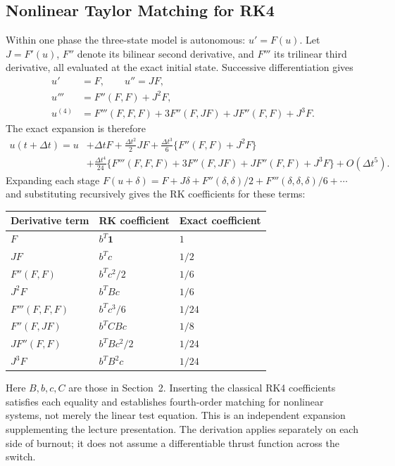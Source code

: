 \documentclass{article}
\begin{document}
\subsection{Nonlinear Taylor Matching for RK4}
Within one phase the three-state model is autonomous: $u'=F(u)$. Let $J=F'(u)$, $F''$ denote its bilinear second derivative, and $F'''$ its trilinear third derivative, all evaluated at the exact initial state. Successive differentiation gives
\begin{align*}
 u'&=F,\qquad u''=JF,\\
 u'''&=F''(F,F)+J^2F,\\
 u^{(4)}&=F'''(F,F,F)+3F''(F,JF)+JF''(F,F)+J^3F.
\end{align*}
The exact expansion is therefore
\begin{align*}
 u(t+\Delta t)=u
 &+\Delta t F+\frac{\Delta t^2}{2}JF
 +\frac{\Delta t^3}{6}\{F''(F,F)+J^2F\}\\
 &+\frac{\Delta t^4}{24}\{F'''(F,F,F)+3F''(F,JF)+JF''(F,F)+J^3F\}
 +O(\Delta t^5).
\end{align*}
Expanding each stage $F(u+\delta)=F+J\delta+F''(\delta,\delta)/2+F'''(\delta,\delta,\delta)/6+\cdots$ and substituting recursively gives the RK coefficients for these terms:
\begin{center}
\begin{tabular}{lll}
\toprule
Derivative term & RK coefficient & Exact coefficient\\
\midrule
$F$ & $b^T\mathbf{1}$ & $1$\\
$JF$ & $b^Tc$ & $1/2$\\
$F''(F,F)$ & $b^Tc^2/2$ & $1/6$\\
$J^2F$ & $b^TBc$ & $1/6$\\
$F'''(F,F,F)$ & $b^Tc^3/6$ & $1/24$\\
$F''(F,JF)$ & $b^TCBc$ & $1/8$\\
$JF''(F,F)$ & $b^TBc^2/2$ & $1/24$\\
$J^3F$ & $b^TB^2c$ & $1/24$\\
\bottomrule
\end{tabular}
\end{center}
Here $B,b,c,C$ are those in Section~2. Inserting the classical RK4 coefficients satisfies each equality and establishes fourth-order matching for nonlinear systems, not merely the linear test equation. This is an independent expansion supplementing the lecture presentation. The derivation applies separately on each side of burnout; it does not assume a differentiable thrust function across the switch.
\end{document}
